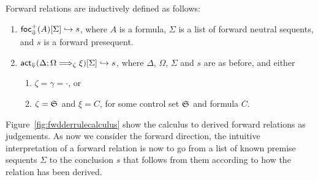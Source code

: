 \begin{definition}
  Forward relations are inductively defined as follows:

  \begin{enumerate}
  \item $\textsf{foc}^+_{\Downarrow}(A) [\Sigma] \hookrightarrow s$, where $A$ is a formula, $\Sigma$ is a
    list of forward neutral sequents, and $s$ is a forward presequent.
  \item $\textsf{act}_{\Downarrow}(\Delta ; \Omega \Longrightarrow_{\zeta} \xi)  [\Sigma] \hookrightarrow s$,
    where $\Delta$, $\Omega$, $\Sigma$ and $s$ are as before, and either
    \begin{enumerate}
    \item $\zeta = \gamma = \cdot$, or
    \item $\zeta = \mathfrak{S}_{}$ and $\xi = C$, for some control set $\mathfrak{S}_{}$
      and formula $C$.
    \end{enumerate}
  \end{enumerate}
\end{definition}

Figure~\ref{fig:fwdderrulecalculus} show the calculus to derived forward
relations as judgements. As now we consider the forward direction, the intuitive
interpretation of a forward relation is now to go from a list of known premise
sequents $\Sigma$ to the conclusion $s$ that follows from them according to how
the relation has been derived.

